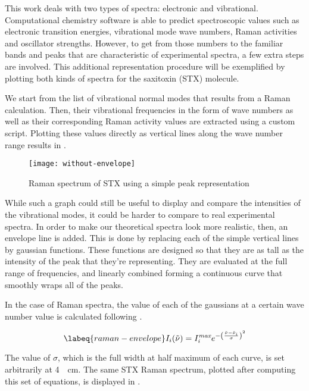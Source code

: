 This work deals with two types of spectra: electronic and vibrational.
Computational chemistry software is able to predict spectroscopic values such as electronic transition energies, vibrational mode wave numbers, Raman activities and oscillator strengths.
However, to get from those numbers to the familiar bands and peaks that are characteristic of experimental spectra, a few extra steps are involved.
This additional representation procedure will be exemplified by plotting both kinds of spectra for the saxitoxin (STX) molecule.

We start from the list of vibrational normal modes that results from a Raman calculation.
Then, their vibrational frequencies in the form of wave numbers as well as their corresponding Raman activity values are extracted using a custom script.
Plotting these values directly as vertical lines along the wave number range results in .

\begin{figure}
    \centering
    \texttt{[image: without-envelope]}
    \caption[Raman spectrum as simple peaks]{Raman spectrum of STX using a simple peak representation}
\end{figure}

While such a graph could still be useful to display and compare the intensities of the vibrational modes, it could be harder to compare to real experimental spectra.
In order to make our theoretical spectra look more realistic, then, an envelope line is added.
This is done by replacing each of the simple vertical lines by gaussian functions.
These functions are designed so that they are as tall as the intensity of the peak that they're representing.
They are evaluated at the full range of frequencies, and linearly combined forming a continuous curve that smoothly wraps all of the peaks.

In the case of Raman spectra, the value of each of the gaussians at a certain wave number value is calculated following .

\begin{equation}
    \labeq{raman-envelope}
    I_i (\tilde{\nu}) = I_i^\textit{max}e^{-\left(\frac{\tilde{\nu} - \tilde{\nu}_i}{\sigma}\right)^2}
\end{equation}

The value of $\sigma$, which is the full width at half maximum of each curve, is set arbitrarily at \SI{4}{\per\cm}.
The same STX Raman spectrum, plotted after computing this set of equations, is displayed in .

